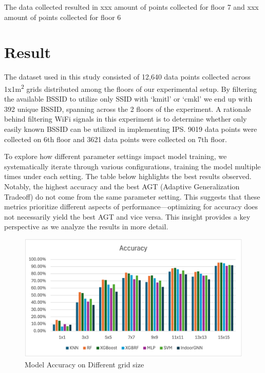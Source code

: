 \documentclass[conference]{IEEEtran}
\begin{document}
	The data collected resulted in xxx amount of points collected for floor 7 and xxx amount of points collected for floor 6
	
	
	\section{Result}
	The dataset used in this study consisted of 12,640 data points collected across 1x1m\textsuperscript{2} grids distributed among the floors of our experimental setup. By filtering the available BSSID to utilize only SSID with ‘kmitl’ or ‘cmkl’ we end up with 392 unique BSSID, spanning across the 2 floors of the experiment. A rationale behind filtering WiFi signals in this experiment is to determine whether only easily known BSSID can be utilized in implementing IPS. 9019 data points were collected on 6th floor and 3621 data points were collected on 7th floor.
	
	To explore how different parameter settings impact model training, we systematically iterate through various configurations, training the model multiple times under each setting. The table below highlights the best results observed. Notably, the highest accuracy and the best AGT (Adaptive Generalization Tradeoff) do not come from the same parameter setting. This suggests that these metrics prioritize different aspects of performance—optimizing for accuracy does not necessarily yield the best AGT and vice versa. This insight provides a key perspective as we analyze the results in more detail.
	
	\begin{figure}[htbp]
		\centerline{\includegraphics[scale=0.65]{image3.png}}
		\caption{Model Accuracy on Different grid size}
		\label{fig1}
	\end{figure}
	
\end{document}
